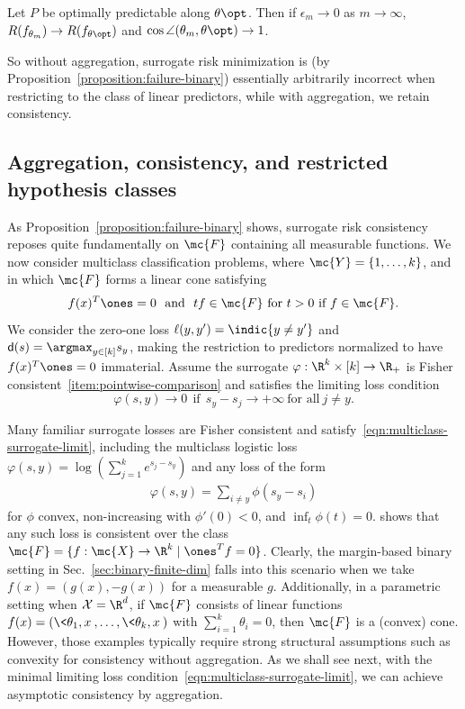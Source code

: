 \documentclass[11pt]{article}
\newcommand{\pred}{\mathsf{d}}  %
\newcommand{\sX}{\mathcal{X}} %
\newcommand{\tloss}{\ell}  %
\newcommand{\sloss}{\varphi}  %
\begin{document}
\begin{corollary}
  \label{cor:agg-consistency-binary}
  Let $P$ be optimally predictable along $\theta\opt$.
  Then if $\epsilon_m \to 0$ as $m \to \infty$,
  $R(f_{\theta_m}) \to R(f_{\theta\opt})$
  and $\cos \angle (\theta_m, \theta\opt ) \to 1$.
\end{corollary}
\noindent
So without aggregation, surrogate risk minimization is (by
Proposition~\ref{proposition:failure-binary}) essentially arbitrarily
incorrect when restricting to the class of linear predictors, while with
aggregation, we retain consistency.

\subsection{Aggregation, consistency, and restricted hypothesis classes}


As Proposition~\ref{proposition:failure-binary} shows,
surrogate risk consistency reposes quite fundamentally on
$\mc{F}$ containing all measurable functions.
%
We now consider multiclass classification problems, where
$\mc{Y} = \{1, \ldots, k\}$, and in which $\mc{F}$ forms a
linear cone satisfying
\begin{equation*}
  f(x)^T \ones = 0
  ~~ \mbox{and} ~~ t f \in \mc{F}
  ~ \mbox{for~} t > 0 ~ \mbox{if}~ f \in \mc{F}.
\end{equation*}
We consider the zero-one loss $\tloss(y, y') = \indic{y \neq y'}$ and
$\pred(s) = \argmax_{y \in [k]} s_y$, making the restriction to predictors
normalized to have $f(x)^T \ones = 0$ immaterial.
%
Assume the surrogate $\sloss : \R^k \times [k] \to \R_+$ is
Fisher consistent~\eqref{item:pointwise-comparison} and satisfies the
limiting loss condition
\begin{equation}
  \label{eqn:multiclass-surrogate-limit}
  \sloss(s, y) \to 0
  ~~ \mbox{if} ~~
  s_y - s_j \to +\infty
  ~ \mbox{for~all}~ j \neq y.
\end{equation}

Many familiar surrogate losses are Fisher
consistent and satisfy~\eqref{eqn:multiclass-surrogate-limit}, including the
multiclass logistic loss $\sloss(s, y) = \log(\sum_{j = 1}^k e^{s_j - s_y})$
and any loss of the form
\begin{align*} 
  \sloss(s, y) = \sum_{i \neq y} \phi(s_y - s_i)
\end{align*}
for $\phi$ convex, non-increasing with $\phi'(0) < 0$,
and $\inf_t \phi(t) = 0$.
%
\citet[Thm.~8]{Zhang04a} shows that any such loss is
consistent over the class $\mc{F} = \{f : \mc{X} \to \R^k \mid \ones^T f = 0\}$.
%
Clearly, the margin-based binary setting in Sec.~\ref{sec:binary-finite-dim}
falls into this scenario when we take $f(x) = (g(x), -g(x))$ for a
measurable $g$.
%
Additionally, in a parametric setting when $\sX = \R^d$, if $\mc{F}$
consists of linear functions $f(x) = (\<\theta_1, x\>, \ldots, \<\theta_k,
x\>)$ with $\sum_{i = 1}^k \theta_i = 0$, then $\mc{F}$ is a (convex) cone. However, those examples typically require strong structural assumptions such as convexity for consistency without aggregation. As we shall see next, with the minimal limiting loss condition~\eqref{eqn:multiclass-surrogate-limit}, we can achieve asymptotic consistency by aggregation.
\end{document}
